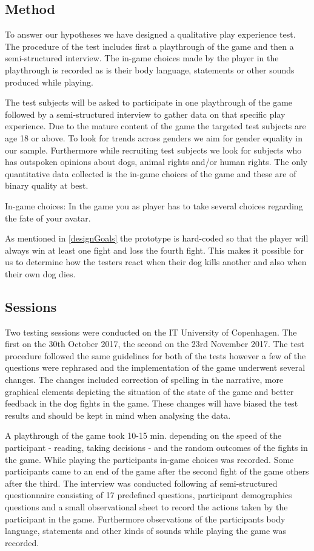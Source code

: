 \subsection{Method}
To answer our hypotheses we have designed a qualitative play experience test. The procedure of the test includes first a playthrough of the game and then a semi-structured interview. The in-game choices made by the player in the playthrough is recorded as is their body language, statements or other sounds produced while playing.

The test subjects will be asked to participate in one playthrough of the game followed by a semi-structured interview to gather data on that specific play experience. Due to the mature content of the game the targeted test subjects are age 18 or above. To look for trends across genders we aim for gender equality in our sample. Furthermore while recruiting test subjects we look for subjects who has outspoken opinions about dogs, animal rights and/or human rights. The only quantitative data collected is the in-game choices of the game and these are of binary quality at best. 

In-game choices:
In the game you as player has to take several choices regarding the fate of your avatar. 

As mentioned in \ref{designGoals} the prototype is hard-coded so that the player will always win at least one fight and loss the fourth fight. This makes it possible for us to determine how the testers react when their dog kills another and also when their own dog dies.\

\subsection{Sessions}
Two testing sessions were conducted on the IT University of Copenhagen. The first on the 30th October 2017, the second on the 23rd November 2017. The test procedure followed the same guidelines for both of the tests however a few of the questions were rephrased and the implementation of the game underwent several changes. The changes included correction of spelling in the narrative, more graphical elements depicting the situation of the state of the game and better feedback in the dog fights in the game. These changes will have biased the test results and should be kept in mind when analysing the data.

A playthrough of the game took 10-15 min. depending on the speed of the participant - reading, taking decisions - and the random outcomes of the fights in the game. While playing the participants in-game choices was recorded. Some participants came to an end of the game after the second fight of the game others after the third.
The interview was conducted following af semi-structured questionnaire consisting of 17 predefined questions, participant demographics questions and a small observational sheet to record the actions taken by the participant in the game. Furthermore observations of the participants body language, statements and other kinds of sounds while playing the game was recorded.

